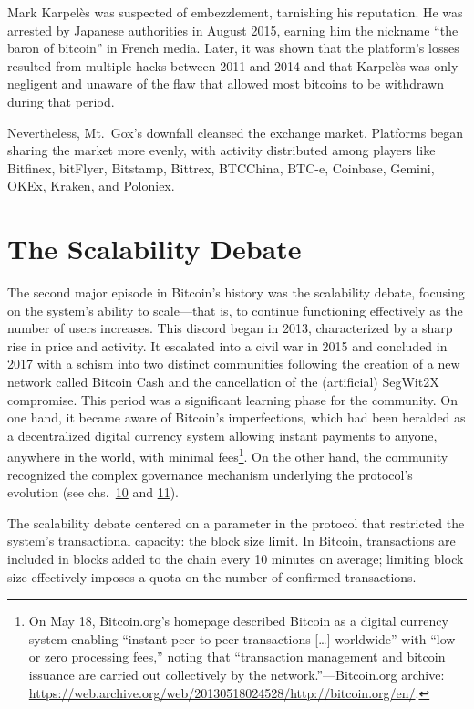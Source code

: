 \documentclass[
  a5paper,
  smalldemyvopaper,10pt,twoside,onecolumn,openright,extrafontsizes,hidelinks]{memoir}
\begin{document}
Mark Karpelès was suspected of embezzlement, tarnishing his reputation.
He was arrested by Japanese authorities in August 2015, earning him the
nickname ``the baron of bitcoin'' in French media. Later, it was shown
that the platform's losses resulted from multiple hacks between 2011 and
2014 and that Karpelès was only negligent and unaware of the flaw that
allowed most bitcoins to be withdrawn during that period.

Nevertheless, Mt.~Gox's downfall cleansed the exchange market. Platforms
began sharing the market more evenly, with activity distributed among
players like Bitfinex, bitFlyer, Bitstamp, Bittrex, BTCChina, BTC-e,
Coinbase, Gemini, OKEx, Kraken, and Poloniex.

\section*{The Scalability
Debate}\label{le-duxe9bat-sur-la-scalabilituxe9}


The second major episode in Bitcoin's history was the scalability
debate, focusing on the system's ability to scale---that is, to continue
functioning effectively as the number of users increases. This discord
began in 2013, characterized by a sharp rise in price and activity. It
escalated into a civil war in 2015 and concluded in 2017 with a schism
into two distinct communities following the creation of a new network
called Bitcoin Cash and the cancellation of the (artificial) SegWit2X
compromise. This period was a significant learning phase for the
community. On one hand, it became aware of Bitcoin's imperfections,
which had been heralded as a decentralized digital currency system
allowing instant payments to anyone, anywhere in the world, with minimal
fees\footnote{On May 18, Bitcoin.org's homepage described Bitcoin as a
  digital currency system enabling ``instant peer-to-peer transactions
  {[}\ldots{]} worldwide'' with ``low or zero processing fees,'' noting
  that ``transaction management and bitcoin issuance are carried out
  collectively by the network.''---Bitcoin.org archive:
  \url{https://web.archive.org/web/20130518024528/http://bitcoin.org/en/}.}.
On the other hand, the community recognized the complex governance
mechanism underlying the protocol's evolution (see
chs.~\hyperref[ch:changement]{10} and \hyperref[ch:determination]{11}).

The scalability debate centered on a parameter in the protocol that
restricted the system's transactional capacity: the block size limit. In
Bitcoin, transactions are included in blocks added to the chain every 10
minutes on average; limiting block size effectively imposes a quota on
the number of confirmed transactions.
\end{document}
